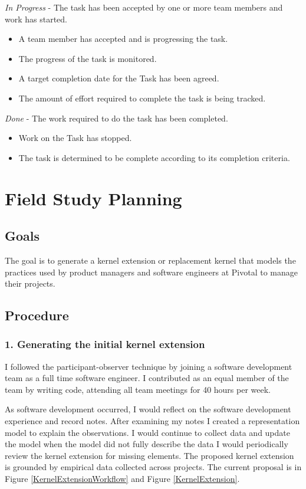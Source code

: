 \documentclass[preprint,12pt,3p]{elsarticle}
\begin{document}
{\textit{In Progress} - The task has been accepted by one or more team members and work has started.
\begin{itemize}
\item A team member has accepted and is progressing the task.
\item The progress of the task is monitored.
\item A target completion date for the Task has been agreed. 
\item The amount of effort required to complete the task is being tracked.
\end{itemize}

\textit{Done} - The work required to do the task has been completed.
\begin{itemize}
\item Work on the Task has stopped.
\item The task is determined to be complete according to its completion criteria. 
\end{itemize}

\section{Field Study Planning} 

\subsection{Goals}
The goal is to generate a kernel extension or replacement kernel that models the practices used by product managers and software engineers at Pivotal to manage their projects.

\subsection{Procedure}
\subsubsection{1. Generating the initial kernel extension}
I followed the participant-observer technique by joining a software development team as a full time software engineer. I contributed as an equal member of the team by writing code, attending all team meetings for 40 hours per week. 

As software development occurred, I would reflect on the software development experience and record notes. After examining my notes I created a representation model to explain the observations. I would continue to collect data and update the model when the model did not fully describe the data  I would periodically review the kernel extension for missing elements. The proposed kernel extension is grounded by empirical data collected across projects. The current proposal is in Figure \ref{KernelExtensionWorkflow} and Figure \ref{KernelExtension}.

}
\end{document}

